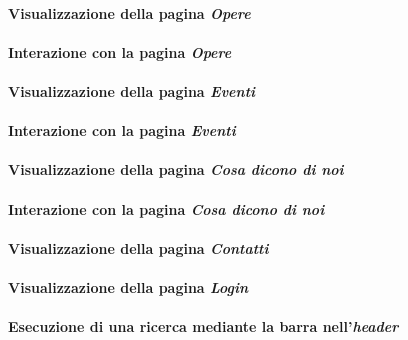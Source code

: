 \paragraph{Visualizzazione della pagina \textit{Opere}}
\label{analisi-casi-uso-attori-principali-utente-generico-4}

\paragraph{Interazione con la pagina \textit{Opere}}
\label{analisi-casi-uso-attori-principali-utente-generico-5}

\paragraph{Visualizzazione della pagina \textit{Eventi}}
\label{analisi-casi-uso-attori-principali-utente-generico-6}

\paragraph{Interazione con la pagina \textit{Eventi}}
\label{analisi-casi-uso-attori-principali-utente-generico-7}

\paragraph{Visualizzazione della pagina \textit{Cosa dicono di noi}}
\label{analisi-casi-uso-attori-principali-utente-generico-8}

\paragraph{Interazione con la pagina \textit{Cosa dicono di noi}}
\label{analisi-casi-uso-attori-principali-utente-generico-9}

\paragraph{Visualizzazione della pagina \textit{Contatti}}
\label{analisi-casi-uso-attori-principali-utente-generico-10}

\paragraph{Visualizzazione della pagina \textit{Login}}
\label{analisi-casi-uso-attori-principali-utente-generico-11}

\paragraph{Esecuzione di una ricerca mediante la barra nell'\textit{header}}
\label{analisi-casi-uso-attori-principali-utente-generico-12}

